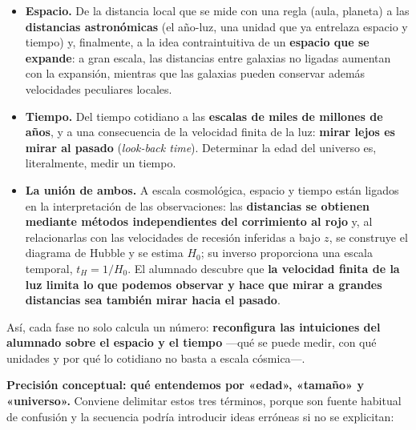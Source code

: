 \begin{itemize}
\item \textbf{Espacio.} De la distancia local que se mide con una regla (aula, planeta) a las \textbf{distancias astronómicas} (el año-luz, una unidad que ya entrelaza espacio y tiempo) y, finalmente, a la idea contraintuitiva de un \textbf{espacio que se expande}: a gran escala, las distancias entre galaxias no ligadas aumentan con la expansión, mientras que las galaxias pueden conservar además velocidades peculiares locales.
\item \textbf{Tiempo.} Del tiempo cotidiano a las \textbf{escalas de miles de millones de años}, y a una consecuencia de la velocidad finita de la luz: \textbf{mirar lejos es mirar al pasado} (\textit{look-back time}). Determinar la edad del universo es, literalmente, medir un tiempo.
\item \textbf{La unión de ambos.} A escala cosmológica, espacio y tiempo están ligados en la interpretación de las observaciones: las \textbf{distancias se obtienen mediante métodos independientes del corrimiento al rojo} y, al relacionarlas con las velocidades de recesión inferidas a bajo $z$, se construye el diagrama de Hubble y se estima $H_{0}$; su inverso proporciona una escala temporal, $t_H=1/H_{0}$. El alumnado descubre que \textbf{la velocidad finita de la luz limita lo que podemos observar y hace que mirar a grandes distancias sea también mirar hacia el pasado}.
\end{itemize}

Así, cada fase no solo calcula un número: \textbf{reconfigura las intuiciones del alumnado sobre el espacio y el tiempo} ---qué se puede medir, con qué unidades y por qué lo cotidiano no basta a escala cósmica---.

\textbf{Precisión conceptual: qué entendemos por «edad», «tamaño» y «universo».} Conviene delimitar estos tres términos, porque son fuente habitual de confusión y la secuencia podría introducir ideas erróneas si no se explicitan:

